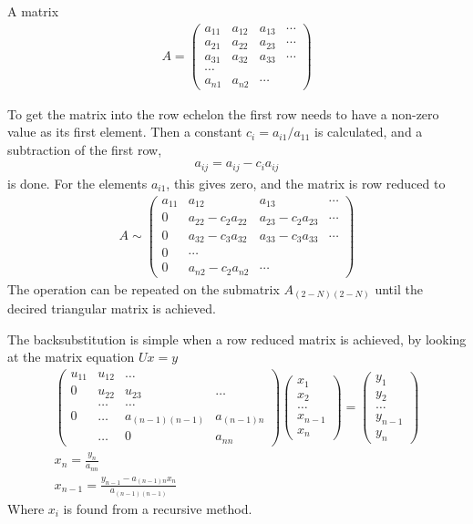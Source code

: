 \documentclass[11pt,a4paper,english,final]{article}
\numberwithin{equation}{section}
\begin{document}
A matrix
\begin{gather}
A = \begin{pmatrix}
    a_{11} & a_{12} & a_{13} & \cdots\\
    a_{21} & a_{22} & a_{23} & \cdots\\
    a_{31} & a_{32} & a_{33} & \cdots\\
    \cdots \\
    a_{n1} & a_{n2} & \cdots
    \end{pmatrix}
\end{gather}

To get the matrix into the row echelon the first row needs to have a non-zero
value as its first element. Then a constant $c_i = a_{i1}/a_{11}$ is 
calculated, and a subtraction of the first row,
\begin{gather}
a_{ij} = a_{ij} - c_i a_{ij}
\end{gather}
is done. For the elements $a_{i1}$, this gives zero, and the matrix is
row reduced to
\begin{gather}
A \sim
\begin{pmatrix}
    a_{11} & a_{12} & a_{13} & \cdots\\
    0 & a_{22} - c_2 a_{22} & a_{23} - c_2 a_{23} & \cdots\\
    0 & a_{32} - c_3 a_{32} & a_{33} - c_3 a_{33} & \cdots\\
    0 & \cdots \\
    0 & a_{n2} - c_2 a_{n2} & \cdots
\end{pmatrix}
\end{gather}
The operation can be repeated on the submatrix $A_{(2-N)(2-N)}$
until the decired triangular matrix is achieved.

The backsubstitution is simple when a row reduced matrix is achieved,
by looking at the matrix equation $Ux = y$
\begin{gather}
\begin{pmatrix} u_{11} & u_{12} & \dots\\
                0 & u_{22} & u_{23} & \dots\\
                &\dots & \dots\\
                0 & \dots & a_{(n-1)(n-1)} & a_{(n-1)n} \\
                & \dots & 0 & a_{nn}
\end{pmatrix} \begin{pmatrix} x_1 \\ x_2 \\ \dots \\ x_{n-1}\\ x_n \end{pmatrix}
 = \begin{pmatrix} y_1 \\ y_2 \\ \dots\\ y_{n-1} \\ y_n \end{pmatrix}\\
 x_n = \frac{y_n}{a_{nn}}\\
 x_{n-1} = \frac{y_{n-1} - a_{(n-1)n}x_n}{a_{(n-1)(n-1)}}
\end{gather}
Where $x_{i}$ is found from a recursive method.
\end{document}
